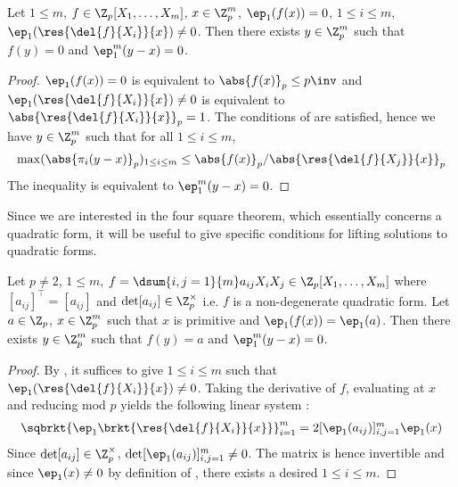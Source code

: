 \begin{prop}
  
  Let $1 \leq m$, $f \in \Z_p[X_1,\dots,X_m]$, $x \in \Z_p^m$, 
  $\ep_1(f(x)) = 0$, $1 \leq i \leq m$, $\ep_1(\res{\del{f}{X_i}}{x}) \neq 0$.
  Then there exists $y \in \Z_p^m$ such that 
  $f(y) = 0$ and $\ep_1^m(y - x) = 0$. 
\end{prop}
\begin{proof}
  $\ep_1(f(x)) = 0$ is equivalent to $\abs{f(x)}_p \leq p\inv$
  and $\ep_1(\res{\del{f}{X_i}}{x}) \neq 0$ is equivalent to 
  $\abs{\res{\del{f}{X_i}}{x}}_p = 1$.
  The conditions of  are satisfied,
  hence we have $y \in \Z_p^m$ such that for all $1 \leq i \leq m$, 
  \[
    \max(\abs{\pi_i(y - x)}_p)_{1\leq i \leq m} 
    \leq {\abs{f(x)}_p}/{\abs{\res{\del{f}{X_j}}{x}}_p}
  \]
  The inequality is equivalent to $\ep_1^m(y - x) = 0$. 
\end{proof}

\begin{rmk}
  Since we are interested in the four square theorem, 
  which essentially concerns a quadratic form, 
  it will be useful to give specific conditions for 
  lifting solutions to quadratic forms. 
\end{rmk}

\begin{prop}
  
  Let $p \neq 2$, $1 \leq m$, 
  $f = \dsum{i,j = 1}{m} a_{ij}X_iX_j \in \Z_p[X_1,\dots,X_m]$ where 
  $[a_{ij}]^\top = [a_{ij}]$ and $\det [a_{ij}] \in \Z_p^\times$
  i.e. $f$ is a non-degenerate quadratic form. 
  Let $a \in \Z_p$, $x \in \Z_p^m$ such that 
  $x$ is primitive and $\ep_1(f(x)) = \ep_1(a)$. 
  Then there exists $y \in \Z_p^m$ such that 
  $f(y) = a$ and $\ep_1^m(y - x) = 0$. 
\end{prop}
\begin{proof}
  By ,
  it suffices to give $1 \leq i \leq m$ such that 
  $\ep_1(\res{\del{f}{X_i}}{x}) \neq 0$. 
  Taking the derivative of $f$, 
  evaluating at $x$ and reducing mod $p$ yields 
  the following linear system : 
  \begin{align*}
    \sqbrkt{\ep_1\brkt{\res{\del{f}{X_i}}{x}}}_{i = 1}^m 
    = 2 [\ep_1(a_{ij})]_{i,j = 1}^m \ep_1(x)
  \end{align*}
  Since $\det [a_{ij}] \in \Z_p^\times$, 
  $\det [\ep_1(a_{ij})]_{i,j = 1}^m \neq 0$.
  The matrix is hence invertible and since 
  $\ep_1(x) \neq 0$ by definition of ,
  there exists a desired $1 \leq i \leq m$. 
\end{proof}

